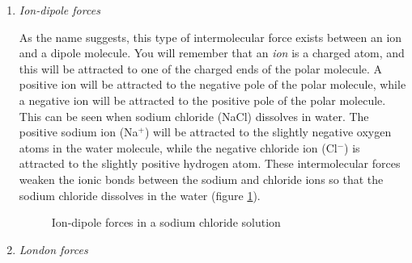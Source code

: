 \begin{enumerate}
\begin{enumerate}
\item{\textit{Ion-dipole forces}

As the name suggests, this type of intermolecular force exists between an ion and a dipole molecule. You will remember that an \textit{ion} is a charged atom, and this will be attracted to one of the charged ends of the polar molecule. A positive ion will be attracted to the negative pole of the polar molecule, while a negative ion will be attracted to the positive pole of the polar molecule. This can be seen when sodium chloride (NaCl) dissolves in water. The positive sodium ion (Na$^{+}$) will be attracted to the slightly negative oxygen atoms in the water molecule, while the negative chloride ion (Cl$^{-}$) is attracted to the slightly positive hydrogen atom. These intermolecular forces weaken the ionic bonds between the sodium and chloride ions so that the sodium chloride dissolves in the water (figure \ref{fig:ion-dipole}).

\begin{figure}[H]
\begin{center}
\caption{Ion-dipole forces in a sodium chloride solution}
\label{fig:ion-dipole}
\end{center}
\end{figure}
}

\item{\textit{London forces}}


\end{enumerate}
\end{enumerate}
